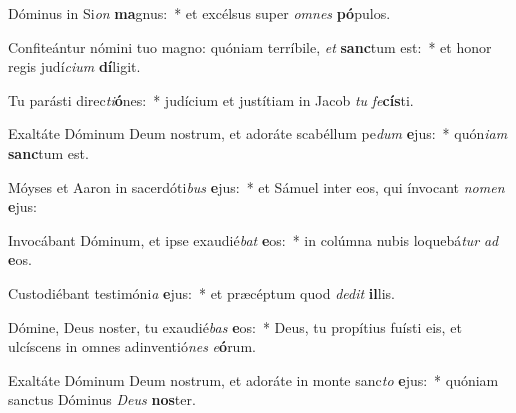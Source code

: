 \item Dóminus in Si\textit{on} \textbf{ma}gnus:~* et excélsus super \textit{om}\textit{nes} \textbf{pó}pulos.
\item Confiteántur nómini tuo magno: quóniam terríbile, \textit{et} \textbf{sanc}tum est:~* et honor regis judí\textit{ci}\textit{um} \textbf{dí}ligit.
\item Tu parásti direc\textit{ti}\textbf{ó}nes:~* judícium et justítiam in Jacob \textit{tu} \textit{fe}\textbf{cís}ti.
\item Exaltáte Dóminum Deum nostrum, et adoráte scabéllum pe\textit{dum} \textbf{e}jus:~* quón\textit{i}\textit{am} \textbf{sanc}tum est.
\item Móyses et Aaron in sacerdóti\textit{bus} \textbf{e}jus:~* et Sámuel inter eos, qui ínvocant \textit{no}\textit{men} \textbf{e}jus:
\item Invocábant Dóminum, et ipse exaudié\textit{bat} \textbf{e}os:~* in colúmna nubis loquebá\textit{tur} \textit{ad} \textbf{e}os.
\item Custodiébant testimóni\textit{a} \textbf{e}jus:~* et præcéptum quod \textit{de}\textit{dit} \textbf{il}lis.
\item Dómine, Deus noster, tu exaudié\textit{bas} \textbf{e}os:~* Deus, tu propítius fuísti eis, et ulcíscens in omnes adinventió\textit{nes} \textit{e}\textbf{ó}rum.
\item Exaltáte Dóminum Deum nostrum, et adoráte in monte sanc\textit{to} \textbf{e}jus:~* quóniam sanctus Dóminus \textit{De}\textit{us} \textbf{nos}ter.
